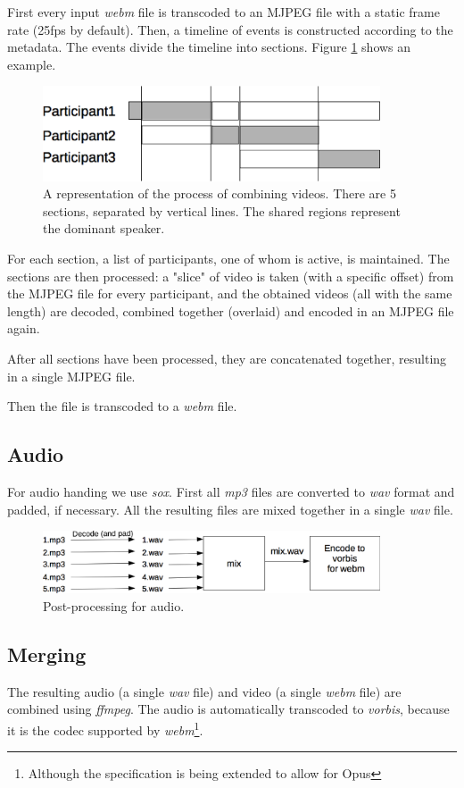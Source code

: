 \documentclass[twoside,openright,a4paper,12pt,english]{article}
\begin{document}
First every input \emph{webm} file is transcoded to an MJPEG file with a static
frame rate (25fps by default). Then, a timeline of events is constructed
according to the metadata. The events divide the timeline into sections. Figure \ref{jipopro-video} shows an example.

\begin{figure}[h]
    \includegraphics[width=10cm]{./pics/jipopro-video.eps}
    \caption{A representation of the process of combining videos. There are 5 sections,
    separated by vertical lines. The shared regions represent the dominant
    speaker.}
    \label{jipopro-video}
\end{figure}
For each section, a list of participants, one of whom is active, is maintained.
The sections are then processed: a "slice" of video is taken
(with a specific offset) from the MJPEG file for every participant, and the
obtained videos (all with the same length) are decoded, combined together (overlaid)
and encoded in an MJPEG file again.

After all sections have been processed, they are concatenated together, resulting in
a single MJPEG file.

Then the file is transcoded to a \emph{webm} file.


\subsection{Audio}
For audio handing we use \emph{sox}\cite{sox}.
First all \emph{mp3} files are converted to \emph{wav} format and padded, if
necessary. All the resulting files are mixed together in a single \emph{wav}
file.

\begin{figure}[h]
    \includegraphics[width=10cm]{./pics/audio-popro.eps}
    \caption{Post-processing for audio.}
\end{figure}


\subsection{Merging}
The resulting audio (a single \emph{wav} file) and video (a single \emph{webm} file)
are combined using \emph{ffmpeg}. The audio is automatically transcoded to \emph{vorbis}, because it is the codec supported by \emph{webm}\footnote{Although the specification is being extended to allow for Opus}.
\end{document}
